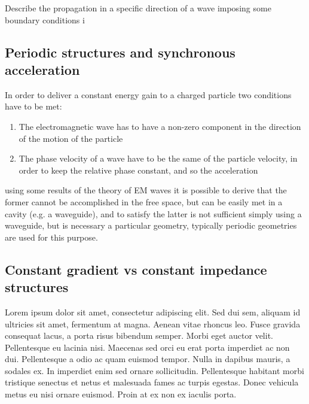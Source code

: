 Describe the propagation in a specific direction of a wave imposing some boundary conditions i








\subsection[Periodic structures and synchronous acceleration]{Periodic structures and synchronous acceleration}

In order to deliver a  constant energy gain to a charged particle two conditions have to be met:

\begin{enumerate}
\item The electromagnetic wave has to have a non-zero component in the direction of the motion of the particle
\item The phase velocity of a wave have to be the same of the particle velocity, in order to keep the relative phase constant, and so the acceleration
\end{enumerate}
using some results of the theory of EM waves it is possible to derive that the former cannot be accomplished in the free space, but can be easily met in a cavity (e.g. a waveguide), and to satisfy the latter is not sufficient simply using a waveguide, but is necessary a particular geometry, typically periodic geometries are used for this purpose.







\cite{Botta:EM}




\subsection[Constant gradient vs constant impedance structures]{Constant gradient vs constant impedance structures}
Lorem ipsum dolor sit amet, consectetur adipiscing elit. Sed dui sem, aliquam id ultricies sit amet, fermentum at magna. Aenean vitae rhoncus leo. Fusce gravida consequat lacus, a porta risus bibendum semper. Morbi eget auctor velit. Pellentesque eu lacinia nisi. Maecenas sed orci eu erat porta imperdiet ac non dui. Pellentesque a odio ac quam euismod tempor. Nulla in dapibus mauris, a sodales ex. In imperdiet enim sed ornare sollicitudin. Pellentesque habitant morbi tristique senectus et netus et malesuada fames ac turpis egestas. Donec vehicula metus eu nisi ornare euismod. Proin at ex non ex iaculis porta.

